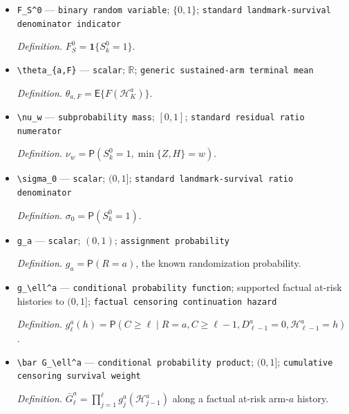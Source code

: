 \documentclass{article}
\begin{document}
\begin{itemize}
  \par\smallskip\noindent\emph{Definition.} \(F_w^0=\mathbf 1\{S_k^0=1,\min\{Z,H\}=w\}\).
  \item \texttt{F\_\allowbreak{}S\textasciicircum{}0} --- \texttt{binary random variable}; \(\{0,1\}\); \texttt{standard landmark-\allowbreak{}survival denominator indicator}
  \par\smallskip\noindent\emph{Definition.} \(F_S^0=\mathbf 1\{S_k^0=1\}\).
  \item \texttt{\textbackslash{}\allowbreak{}theta\_\allowbreak{}\{a,\allowbreak{}F\}\allowbreak{}} --- \texttt{scalar}; \(\mathbb R\); \texttt{generic sustained-\allowbreak{}arm terminal mean}
  \par\smallskip\noindent\emph{Definition.} \(\theta_{a,F}=\mathsf E\{F(\mathcal H_K^a)\}\).
  \item \texttt{\textbackslash{}\allowbreak{}nu\_\allowbreak{}w} --- \texttt{subprobability mass}; \([0,1]\); \texttt{standard residual ratio numerator}
  \par\smallskip\noindent\emph{Definition.} \(\nu_w=\mathsf P(S_k^0=1,\min\{Z,H\}=w)\).
  \item \texttt{\textbackslash{}\allowbreak{}sigma\_\allowbreak{}0} --- \texttt{scalar}; \((0,1]\); \texttt{standard landmark-\allowbreak{}survival ratio denominator}
  \par\smallskip\noindent\emph{Definition.} \(\sigma_0=\mathsf P(S_k^0=1)\).
  \item \texttt{g\_\allowbreak{}a} --- \texttt{scalar}; \((0,1)\); \texttt{assignment probability}
  \par\smallskip\noindent\emph{Definition.} \(g_a=\mathsf P(R=a)\), the known randomization probability.
  \item \texttt{g\_\allowbreak{}\textbackslash{}\allowbreak{}ell\textasciicircum{}a} --- \texttt{conditional probability function}; supported factual at-risk histories to \((0,1]\); \texttt{factual censoring continuation hazard}
  \par\smallskip\noindent\emph{Definition.} \(g_\ell^a(h)=\mathsf P(C\ge\ell\mid R=a,C\ge\ell-1,D_{\ell-1}^a=0,\mathcal H_{\ell-1}^a=h)\).
  \item \texttt{\textbackslash{}\allowbreak{}bar G\_\allowbreak{}\textbackslash{}\allowbreak{}ell\textasciicircum{}a} --- \texttt{conditional probability product}; \((0,1]\); \texttt{cumulative censoring survival weight}
  \par\smallskip\noindent\emph{Definition.} \(\bar G_\ell^a=\prod_{j=1}^{\ell}g_j^a(\mathcal H_{j-1}^a)\) along a factual at-risk arm-\(a\) history.

\end{itemize}
\end{document}
